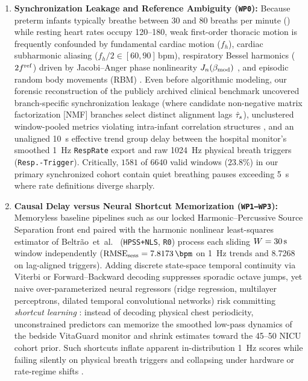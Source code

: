 \begin{enumerate}
  \item \textbf{Synchronization Leakage and Reference Ambiguity (\texttt{WP0}):}
    Because preterm infants typically breathe between $30$ and $80$ breaths per minute (\si{\bpm})
    while resting heart rates occupy \SIrange{120}{180}{\bpm}, weak first-order thoracic motion is
    frequently confounded by fundamental cardiac motion ($f_h$), cardiac subharmonic aliasing
    ($f_h/2 \in [60,90]\,\mathrm{bpm}$), respiratory Bessel harmonics ($2f^{\mathrm{ref}}$) driven by
    Jacobi--Anger phase nonlinearity $J_{n}\!\left(\beta_{\mathrm{mod}}\right)$ \citep{morgan2009novel}, and episodic
    random body movements (RBM) \citep{li2008random,beltrao2022contactless}. Even before algorithmic
    modeling, our forensic reconstruction of the publicly archived clinical benchmark
    \citep{beltrao2022contactless} uncovered branch-specific synchronization leakage (where candidate
    non-negative matrix factorization [NMF] branches select distinct alignment lags $\hat{\tau}_s$),
    unclustered window-pooled metrics violating intra-infant correlation structures
    \citep{bland2007agreement}, and an unaligned \SI{10}{\second} effective trend group delay between the
    hospital monitor's smoothed \SI{1}{\hertz} \texttt{RespRate} export and raw \SI{1024}{\hertz}
    physical breath triggers (\texttt{Resp.-Trigger}). Critically, $1581$ of $6640$ valid windows
    ($23.8\%$) in our primary synchronized cohort contain quiet breathing pauses
    exceeding \SI{5}{\second} where rate definitions diverge sharply.

  \item \textbf{Causal Delay versus Neural Shortcut Memorization (\texttt{WP1--WP3}):}
    Memoryless baseline pipelines such as our locked Harmonic--Percussive Source Separation front end
    \citep{fitzgerald2010harmonic} paired with the harmonic nonlinear least-squares estimator of
    Beltr\~ao~et~al.\ \citep{beltrao2022contactless} (\texttt{HPSS+NLS}, \texttt{R0}) process each
    sliding $W = \SI{30}{\second}$ window independently ($\rmseSess =
    \SI{7.8173}{\bpm}$ on \SI{1}{\hertz} trends and \SI{8.7268}{\bpm} on lag-aligned triggers). Adding
    discrete state-space temporal continuity via Viterbi or Forward--Backward decoding
    \citep{rabiner1989tutorial,ye2021spectral} suppresses sporadic octave jumps, yet naive
    over-parameterized neural regressors (ridge regression, multilayer perceptrons, dilated temporal
    convolutional networks) risk committing \emph{shortcut learning} \citep{geirhos2020shortcut}:
    instead of decoding physical chest periodicity, unconstrained predictors can memorize the
    smoothed low-pass dynamics of the bedside VitaGuard monitor and shrink estimates toward the
    \SIrange{45}{50}{\bpm} NICU cohort prior. Such shortcuts inflate apparent in-distribution \SI{1}{\hertz}
    scores while failing silently on physical breath triggers and collapsing under hardware or
    rate-regime shifts \citep{riou2023pesto,geirhos2020shortcut}.


\end{enumerate}
